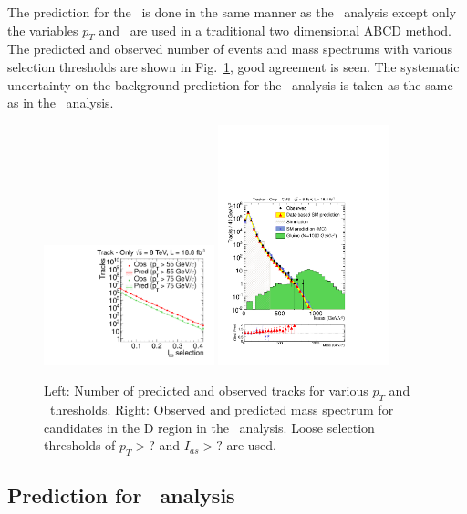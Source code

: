 The prediction for the \tkonly\ is done in the same manner as the \tktof\ analysis except only the variables $p_T$ and \ias\ are used in a traditional two
dimensional ABCD method. The predicted and observed number of events 
and mass spectrums with various selection thresholds are shown in Fig.~\ref{fig:TkLooseMassDistribution}, good agreement is seen.
The systematic uncertainty on the background prediction for the \tkonly\ analysis is taken as the same as in the \tktof\ analysis.

\begin{figure}
 \begin{center}
  \includegraphics[clip=true, trim=0.0cm 0cm 2.8cm 0cm,width=0.44\textwidth]{figures/tkonly/Prediction_Data8TeV_NPredVsNObs}
  \includegraphics[clip=true, trim=0.0cm 0cm 2.8cm 0cm,width=0.44\textwidth]{figures/tkonly/Rescale_Mass_8TeV_Loose}
 \end{center}
 \caption{Left: Number of predicted and observed tracks for various $p_T$ and \ias\ thresholds.
Right: Observed and predicted mass spectrum for candidates in the D region in the \tkonly\ analysis.
Loose selection thresholds of $p_T>?$ and $I_{as}>?$ are used.
\label{fig:TkLooseMassDistribution}}
\end{figure}

\subsection{Prediction for \multi\ analysis}

